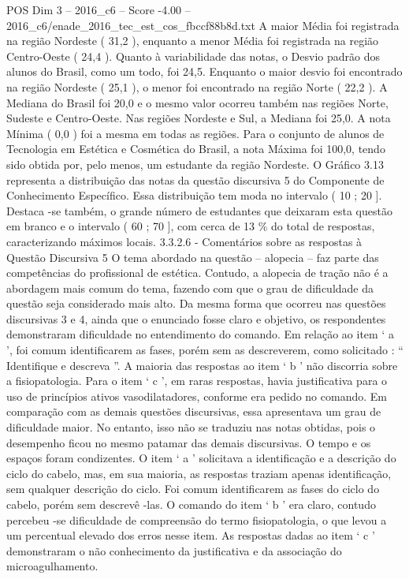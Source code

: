 \begin{textsample}{POS Dim 3 – 2016\_c6 – Score -4.00 – 2016\_c6/enade\_2016\_tec\_est\_cos\_fbccf88b8d.txt}
A maior Média foi registrada na região Nordeste ( 31,2 ), enquanto a menor Média foi registrada na região Centro-Oeste ( 24,4 ).
Quanto à variabilidade das notas, o Desvio padrão dos alunos do Brasil, como um todo, foi 24,5.
Enquanto o maior desvio foi encontrado na região Nordeste ( 25,1 ), o menor foi encontrado na região Norte ( 22,2 ).
A Mediana do Brasil foi 20,0 e o mesmo valor ocorreu também nas regiões Norte, Sudeste e Centro-Oeste.
Nas regiões Nordeste e Sul, a Mediana foi 25,0.
A nota Mínima ( 0,0 ) foi a mesma em todas as regiões.
Para o conjunto de alunos de Tecnologia em Estética e Cosmética do Brasil, a nota Máxima foi 100,0, tendo sido obtida por, pelo menos, um estudante da região Nordeste.
O Gráfico 3.13 representa a distribuição das notas da questão discursiva 5 do Componente de Conhecimento Específico.
Essa distribuição tem moda no intervalo ( 10 ; 20 ].
Destaca -se também, o grande número de estudantes que deixaram esta questão em branco e o intervalo ( 60 ; 70 ], com cerca de 13 \% do total de respostas, caracterizando máximos locais. 3.3.2.6 - Comentários sobre as respostas à Questão Discursiva 5 O tema abordado na questão – alopecia – faz parte das competências do profissional de estética.
Contudo, a alopecia de tração não é a abordagem mais comum do tema, fazendo com que o grau de dificuldade da questão seja considerado mais alto.
Da mesma forma que ocorreu nas questões discursivas 3 e 4, ainda que o enunciado fosse claro e objetivo, os respondentes demonstraram dificuldade no entendimento do comando.
Em relação ao item ‘ a ’, foi comum identificarem as fases, porém sem as descreverem, como solicitado : “ Identifique e descreva ”.
A maioria das respostas ao item ‘ b ’ não discorria sobre a fisiopatologia.
Para o item ‘ c ’, em raras respostas, havia justificativa para o uso de princípios ativos vasodilatadores, conforme era pedido no comando.
Em comparação com as demais questões discursivas, essa apresentava um grau de dificuldade maior.
No entanto, isso não se traduziu nas notas obtidas, pois o desempenho ficou no mesmo patamar das demais discursivas.
O tempo e os espaços foram condizentes.
O item ‘ a ’ solicitava a identificação e a descrição do ciclo do cabelo, mas, em sua maioria, as respostas traziam apenas identificação, sem qualquer descrição do ciclo.
Foi comum identificarem as fases do ciclo do cabelo, porém sem descrevê -las.
O comando do item ‘ b ’ era claro, contudo percebeu -se dificuldade de compreensão do termo fisiopatologia, o que levou a um percentual elevado dos erros nesse item.
As respostas dadas ao item ‘ c ’ demonstraram o não conhecimento da justificativa e da associação do microagulhamento.

\end{textsample}
